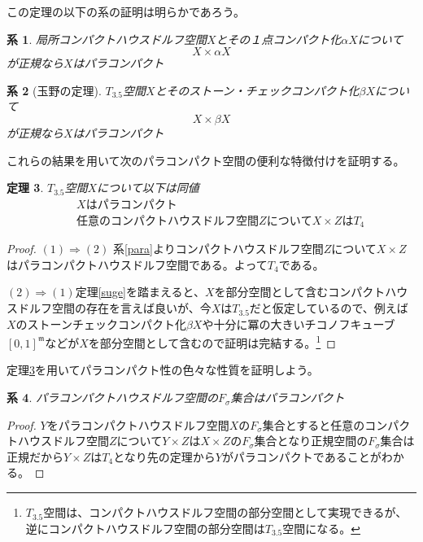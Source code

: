 \documentclass[leqno]{jsarticle}
\newtheorem{thm}{定理}
\newtheorem{cor}[thm]{系}
\newcommand{\To}{\Longrightarrow}
\begin{document}
この定理の以下の系の証明は明らかであろう。
\begin{cor}
局所コンパクトハウスドルフ空間$X$とその１点コンパクト化$\alpha X$について
\[
X\times \alpha X
\]が正規なら$X$はパラコンパクト
\end{cor}

\begin{cor}[玉野の定理]
$T_{3.5}$空間$X$とそのストーン・チェックコンパクト化$\beta X$について
\[
X\times \beta X
\]
が正規なら$X$はパラコンパクト
\end{cor}
これらの結果を用いて次のパラコンパクト空間の便利な特徴付けを証明する。
\begin{thm}\label{main}
$T_{3.5}$空間$X$について以下は同値
\begin{eqnarray}
&&Xはパラコンパクト\\
&&任意のコンパクトハウスドルフ空間ZについてX\times ZはT_4
\end{eqnarray}
\end{thm}
\begin{proof}
$(1)\To (2)$
系\ref{para}よりコンパクトハウスドルフ空間$Z$について$X\times Z$はパラコンパクトハウスドルフ空間である。よって$T_4$である。\par
$(2)\To (1)$定理\ref{suge}を踏まえると、$X$を部分空間として含むコンパクトハウスドルフ空間の存在を言えば良いが、今$X$は$T_{3.5}$だと仮定しているので、例えば$X$のストーンチェックコンパクト化$\beta X$や十分に冪の大きいチコノフキューブ$[0,1]^{\mathfrak{m}}$などが$X$を部分空間として含むので証明は完結する。\footnote{$T_{3.5}$空間は、コンパクトハウスドルフ空間の部分空間として実現できるが、逆にコンパクトハウスドルフ空間の部分空間は$T_{3.5}$空間になる。}
\end{proof}
定理\ref{main}を用いてパラコンパクト性の色々な性質を証明しよう。
\begin{cor}
パラコンパクトハウスドルフ空間の$F_{\sigma}$集合はパラコンパクト
\end{cor}
\begin{proof}$Y$をパラコンパクトハウスドルフ空間$X$の$F_{\sigma}$集合とすると任意のコンパクトハウスドルフ空間$Z$について$Y\times Z$は$X\times Z$の$F_{\sigma}$集合となり正規空間の$F_{\sigma}$集合は正規だから$Y\times Z$は$T_4$となり先の定理から$Y$がパラコンパクトであることがわかる。
\end{proof}
\end{document}

